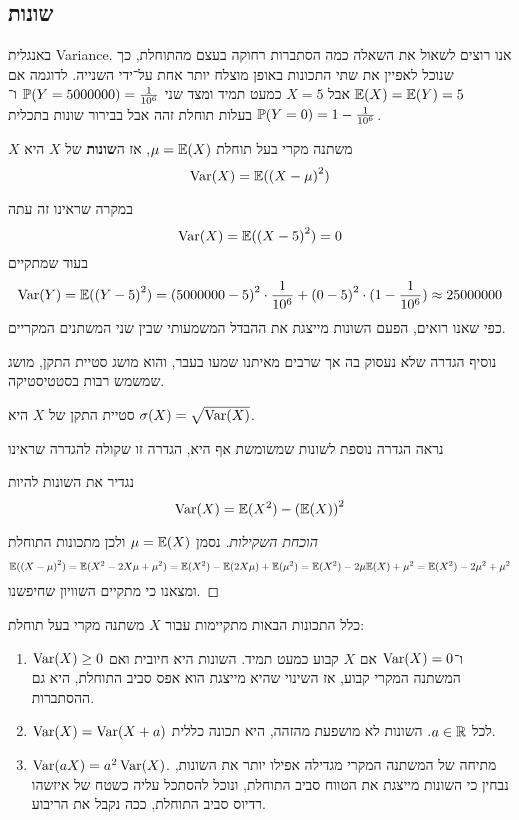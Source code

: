 \subsection{שונות}
באנגלית Variance.
אנו רוצים לשאול את השאלה כמה הסתברות רחוקה בעצם מהתוחלת, כך שנוכל לאפיין את שתי התכונות באופן מוצלח יותר אחת על־ידי השנייה.
לדוגמה אם $\mathbb{E}(X) = \mathbb{E}(Y) = 5$ אבל $X = 5$ כמעט תמיד ומצד שני $\mathbb{P}(Y = 5000000) = \frac{1}{10^6}$ ו־$\mathbb{P}(Y = 0) = 1 - \frac{1}{10^6}$ בעלות תוחלת זהה אבל בבירור שונות בתכלית.
\begin{definition}[שונות]
	$X$ משתנה מקרי בעל תוחלת $\mu = \mathbb{E}(X)$, אז ה\textbf{שונות} של $X$ היא
	\[
		\operatorname{Var}(X) = \mathbb{E}({(X - \mu)}^2)
	\]
\end{definition}
\begin{example}
	במקרה שראינו זה עתה
	\[
		\operatorname{Var}(X) = \mathbb{E}({(X - 5)}^2) = 0
	\]
	בעוד שמתקיים
	\[
		\operatorname{Var}(Y) = \mathbb{E}({(Y - 5)}^2) = {(5000000 - 5)}^2 \cdot \frac{1}{10^6} + {(0 - 5)}^2 \cdot (1 - \frac{1}{10^6}) \approx 25000000
	\]
	כפי שאנו רואים, הפעם השונות מייצגת את ההבדל המשמעותי שבין שני המשתנים המקריים.
\end{example}
נוסיף הגדרה שלא נעסוק בה אך שרבים מאיתנו שמעו בעבר, והוא מושג סטיית התקן, מושג שמשמש רבות בסטטיסטיקה.
\begin{definition}
	סטיית התקן של $X$ היא $\sigma(X) = \sqrt{\operatorname{Var}(X)}$.
\end{definition}
נראה הגדרה נוספת לשונות שמשומשת אף היא, הגדרה זו שקולה להגדרה שראינו
\begin{definition}
	נגדיר את השונות להיות
	\[
		\operatorname{Var}(X) = \mathbb{E}(X^2) - {(\mathbb{E}(X))}^2
	\]
\end{definition}
\begin{proof}[הוכחת השקילות]
	נסמן $\mu = \mathbb{E}(X)$ ולכן מתכונות התוחלת
	\[
		\mathbb{E}({(X - \mu)}^2)
		= \mathbb{E}(X^2 - 2X\mu + \mu^2)
		= \mathbb{E}(X^2) - \mathbb{E}(2X\mu) + \mathbb{E}(\mu^2)
		= \mathbb{E}(X^2) - 2\mu \mathbb{E}(X) + \mu^2
		= \mathbb{E}(X^2) - 2\mu^2 + \mu^2
	\]
	ומצאנו כי מתקיים השוויון שחיפשנו.
\end{proof}
\begin{proposition}
	כלל התכונות הבאות מתקיימות עבור $X$ משתנה מקרי בעל תוחלת:
	\begin{enumerate}
		\item $\operatorname{Var}(X) \ge 0$ ו־$\operatorname{Var}(X) = 0$ אם $X$ קבוע כמעט תמיד. השונות היא חיובית ואם המשתנה המקרי קבוע, אז השינוי שהיא מייצגת הוא אפס סביב התוחלת, היא גם ההסתברות.
		\item $\operatorname{Var}(X) = \operatorname{Var}(X + a)$ לכל $a \in \mathbb{R}$. השונות לא מושפעת מהזהה, היא תכונה כללית.
		\item $\operatorname{Var}(aX) = a^2 \operatorname{Var}(X)$. מתיחה של המשתנה המקרי מגדילה אפילו יותר את השונות, נבחין כי השונות מייצגת את הטווח סביב התוחלת, ונוכל להסתכל עליה כשטח של איזשהו רדיוס סביב התוחלת, ככה נקבל את הריבוע.
	\end{enumerate}
\end{proposition}
